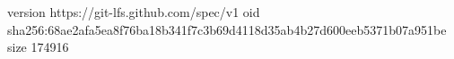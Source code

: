 version https://git-lfs.github.com/spec/v1
oid sha256:68ae2afa5ea8f76ba18b341f7c3b69d4118d35ab4b27d600eeb5371b07a951be
size 174916
